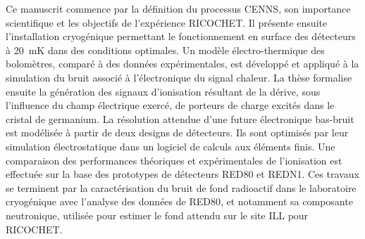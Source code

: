 \documentclass[
11pt, %
english, %
singlespacing, %
headsepline, %
]{MastersDoctoralThesis} %
\begin{document}
\begin{abstractfr}
{Ce manuscrit commence par la définition du processus CENNS, son importance scientifique et les objectifs de l'expérience RICOCHET. Il présente ensuite l'installation cryogénique permettant le fonctionnement en surface des détecteurs à \SI{20}{\milli\kelvin} dans des conditions optimales.
Un modèle électro-thermique des bolomètres, comparé à des données expérimentales, est développé et appliqué à la simulation du bruit associé à l’électronique du signal chaleur.
La thèse formalise ensuite la génération des signaux d'ionisation résultant de la dérive, sous l'influence du champ électrique exercé, de porteurs de charge excités dans le cristal de germanium. La résolution attendue d’une future électronique bas-bruit est modélisée à partir de deux designs de détecteurs. Ils sont optimisés par leur simulation électrostatique dans un logiciel de calculs aux éléments finis. Une comparaison des performances théoriques et expérimentales de l'ionisation est effectuée sur la base des prototypes de détecteurs RED80 et REDN1.
Ces travaux se terminent par la caractérisation du bruit de fond radioactif dans le laboratoire cryogénique avec l’analyse des données de RED80, et notamment sa composante neutronique, utilisée pour estimer le fond attendu sur le site ILL pour RICOCHET.

}
\end{abstractfr}


%


\tableofcontents %


\end{document}
